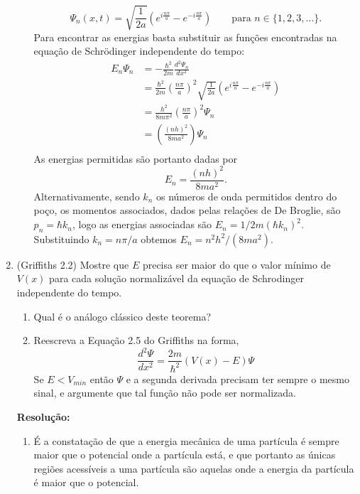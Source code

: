 \documentclass[a4paper, 12pt, notitlepage]{article}
\begin{document}
\begin{enumerate}
\begin{enumerate}
\begin{equation*}
  \Psi_n(x, t) = \sqrt{\frac{1}{2a}} \left( e^{i\frac{n\pi}{a}} - e^{-i\frac{n\pi}{a}}\right)\qquad\text{para }n \in \{1, 2, 3, \ldots\}.
  \end{equation*}
  Para encontrar as energias basta substituir as funções encontradas na equação de Schrödinger independente do tempo:
  \begin{align*}
  E_n \Psi_n &= -\frac{\hbar^2}{2m}\frac{d^2 \Psi_n}{dx^2} \\
  &= \frac{\hbar^2}{2m}\left(\frac{n\pi}{a}\right)^2\sqrt{\frac{1}{2a}}\left(e^{i\frac{n\pi}{a}} - e^{-i\frac{n\pi}{a}}\right) \\
  &= \frac{h^2}{8m\pi^2}\left(\frac{n\pi}{a}\right)^2 \Psi_n \\
  &= \left(\frac{(nh)^2}{8ma^2}\right) \Psi_n \\
  \end{align*}
  As energias permitidas são portanto dadas por
  \begin{equation*}
  E_n = \frac{(nh)^2}{8ma^2}.
  \end{equation*}
  Alternativamente, sendo $k_n$ os números de onda permitidos dentro do poço, os momentos associados, dados pelas relações de De Broglie, são $p_n = \hbar k_n$, logo as energias associadas são $E_n = 1/2m \left(\hbar k_n\right)^2$. Substituindo $k_n = n\pi/a$ obtemos $E_n = n^2 h^2/(8ma^2)$.
\end{enumerate}

\item (Griffiths 2.2) Mostre que $E$ precisa ser maior do que o valor mínimo de $V(x)$ para cada solução normalizável da equação de Schrodinger independente do tempo.
\begin{enumerate}
  \item Qual é o análogo clássico deste teorema?
  \item Reescreva a Equação 2.5 do Griffiths na forma,
  \begin{equation*}
  \frac{d^2 \Psi}{dx^2} = \frac{2m}{\hbar^2}\left(V(x) - E\right)\Psi
  \end{equation*}
  Se $E < V_{min}$ então $\Psi$ e a segunda derivada precisam ter sempre o mesmo sinal, e argumente que tal função não pode ser normalizada.
\end{enumerate}
\textbf{Resolução: }\linebreak
\begin{enumerate}
  \item É a constatação de que a energia mecânica de uma partícula é sempre maior que o potencial onde a partícula está, e que portanto as únicas regiões acessíveis a uma partícula são aquelas onde a energia da partícula é maior que o potencial.


\end{enumerate}
\end{enumerate}
\end{document}

